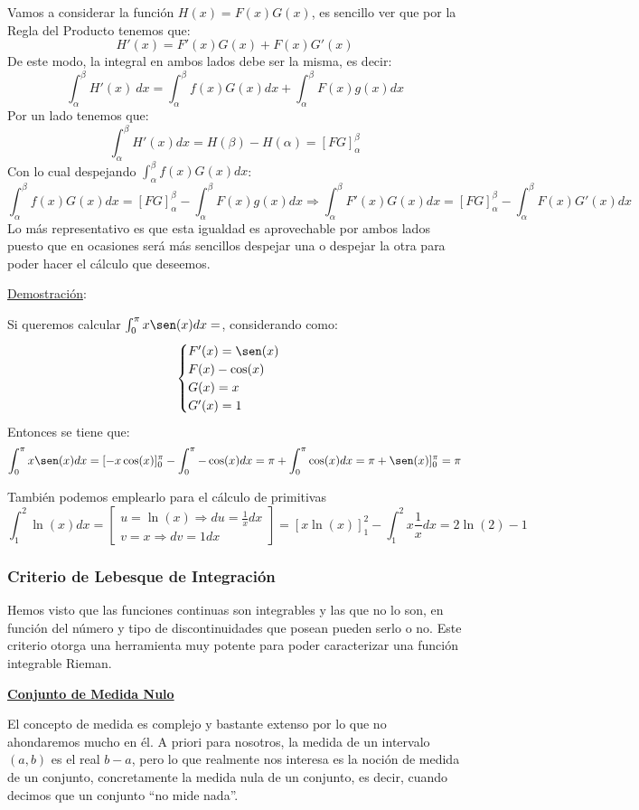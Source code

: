 \documentclass[10pt,a4paper,openright]{book}
\begin{document}
Vamos a considerar la función $H(x)=F(x)G(x)$, es sencillo ver que por la Regla del Producto tenemos que:
$$H'(x)=F'(x)G(x)+F(x)G'(x)$$
De este modo, la integral en ambos lados debe ser la misma, es decir:
$$\int_{\alpha}^{\beta} H'(x) \ dx= \int_{\alpha}^{\beta} f(x)G(x)dx + \int_{\alpha}^{\beta} F(x)g(x)dx$$
Por un lado tenemos que:
$$\int_{\alpha}^{\beta}H'(x)dx = H(\beta)-H(\alpha) = \left[FG\right]_\alpha^\beta$$
Con lo cual despejando $\displaystyle \int_{\alpha}^{\beta} f(x)G(x)dx$:
$$\int_{\alpha}^{\beta} f(x)G(x)dx = [FG]^\beta_\alpha - \int_{\alpha}^{\beta} F(x)g(x)dx\Rightarrow \int_{\alpha}^{\beta} F'(x)G(x)dx = [FG]^\beta_\alpha - \int_{\alpha}^{\beta} F(x)G'(x)dx$$
Lo más representativo es que esta igualdad es aprovechable por ambos lados puesto que en ocasiones será más sencillos despejar una o despejar la otra para poder hacer el cálculo que deseemos.

\underline{Demostración}:

Si queremos calcular $\int_0^\pi x\sen(x) dx =$, considerando como:
$$\begin{cases}F'(x)=\sen(x)\\ F(x)-\cos(x) \\ G(x)=x \\ G'(x) = 1 \end{cases}$$
Entonces se tiene que:
$$\int_0^\pi x\sen(x) dx = [-x\cos (x)]^\pi_0 - \int_0^\pi -\cos (x)dx = \pi + \int_0^\pi \cos (x)dx = \pi + \sen(x)]^\pi_0 = \pi$$

También podemos emplearlo para el cálculo de primitivas
$$\int_1^2 \ln(x) dx = \begin{bmatrix} u = \ln (x) \Rightarrow du =\frac{1}{x} dx \\ v = x \Rightarrow dv = 1dx\end{bmatrix} =[x\ln(x)]^2_1 - \int_1^2 x \frac{1}{x} dx = 2 \ln (2) - 1$$

\subsubsection*{Criterio de Lebesque de Integración}
Hemos visto que las funciones continuas son integrables y las que no lo son, en función del número y tipo de discontinuidades que posean pueden serlo o no. Este criterio otorga una herramienta muy potente para poder caracterizar una función integrable Rieman.

\underline{\textbf{Conjunto de Medida Nulo}}

El concepto de medida es complejo y bastante extenso por lo que no ahondaremos mucho en él. A priori para nosotros, la medida de un intervalo $(a,b)$ es el real $b-a$, pero lo que realmente nos interesa es la noción de medida de un conjunto, concretamente la medida nula de un conjunto, es decir, cuando decimos que un conjunto ``no mide nada''. 
\end{document}
